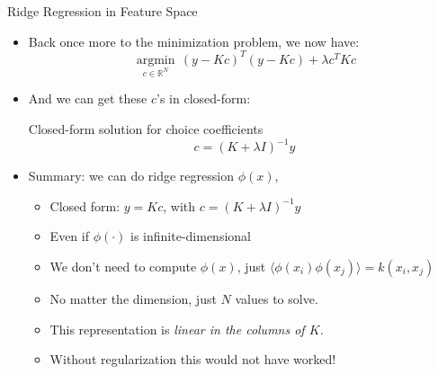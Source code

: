 \documentclass{beamer}
\numberwithin{equation}{section}
\begin{document}
\begin{frame}{Ridge Regression in Feature Space}
\begin{itemize}
\item<1-> \footnotesize Back once more to the minimization problem, we now have:
$$\underset{c \in \mathbb{R}^N}{\operatorname{argmin}}\,(y-Kc)^{T}(y-Kc)+\lambda c^{T}Kc $$

\item<2-> \footnotesize And we can get these $c$'s in closed-form:
\begin{block}{Closed-form solution for choice coefficients}
\begin{equation}
c=(K+\lambda I)^{-1}y
\end{equation}
\end{block}

\item<3-> Summary: we can do ridge regression $\phi(x)$,
\begin{itemize}
\item \footnotesize Closed form: $y=Kc$, with $c=(K+\lambda I)^{-1}y$
\item \footnotesize Even if $\phi(\cdot)$ is infinite-dimensional
\item \footnotesize We don't need to compute $\phi(x)$, just $\langle \phi(x_i) \phi(x_j) \rangle=k(x_i,x_j)$
\item \footnotesize No matter the dimension, just $N$ values to solve.
\item \footnotesize This representation is \textit{linear in the columns of $K$.}
\item \footnotesize Without regularization this would not have worked!
\end{itemize}
\end{itemize}
\end{frame}
\end{document}
